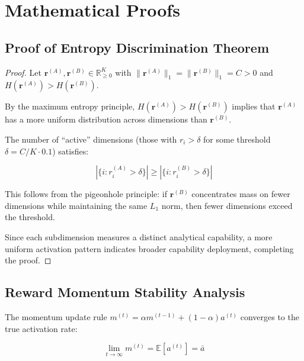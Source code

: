 \documentclass{article}
\begin{document}
\appendix
\section{Mathematical Proofs}

\subsection{Proof of Entropy Discrimination Theorem}

\begin{proof}
Let $\mathbf{r}^{(A)}, \mathbf{r}^{(B)} \in \mathbb{R}^K_{\geq 0}$ with $\|\mathbf{r}^{(A)}\|_1 = \|\mathbf{r}^{(B)}\|_1 = C > 0$ and $H(\mathbf{r}^{(A)}) > H(\mathbf{r}^{(B)})$.

By the maximum entropy principle, $H(\mathbf{r}^{(A)}) > H(\mathbf{r}^{(B)})$ implies that $\mathbf{r}^{(A)}$ has a more uniform distribution across dimensions than $\mathbf{r}^{(B)}$.

The number of ``active'' dimensions (those with $r_i > \delta$ for some threshold $\delta = C/K \cdot 0.1$) satisfies:

\begin{equation}
    |\{i : r_i^{(A)} > \delta\}| \geq |\{i : r_i^{(B)} > \delta\}|
\end{equation}

This follows from the pigeonhole principle: if $\mathbf{r}^{(B)}$ concentrates mass on fewer dimensions while maintaining the same $L_1$ norm, then fewer dimensions exceed the threshold.

Since each subdimension measures a distinct analytical capability, a more uniform activation pattern indicates broader capability deployment, completing the proof.
\end{proof}

\subsection{Reward Momentum Stability Analysis}

The momentum update rule $m^{(t)} = \alpha m^{(t-1)} + (1-\alpha) a^{(t)}$ converges to the true activation rate:

\begin{equation}
    \lim_{t \to \infty} m^{(t)} = \mathbb{E}[a^{(t)}] = \bar{a}
\end{equation}
\end{document}
